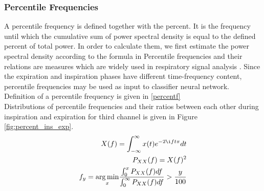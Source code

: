 \subsubsection{Percentile Frequencies}
A percentile frequency is defined together with the percent. It is the frequency until which the cumulative sum of power spectral density is equal to the defined percent of total power. In order to calculate them, we first estimate the power spectral density according to the formula in Percentile frequencies and their relations are measures which are widely used in respiratory signal analysis \cite{sergul, comparison-ar-based}. Since the expiration and inspiration phases have different time-frequency content, percentile frequencies may be used as input to classifier neural network. Definition of a percentile frequency is given in \eqref{percentf} \\ Distributions of percentile frequencies and their ratios between each other during inspiration and expiration for third channel is given in Figure \ref{fig:percent_ins_exp}.
\begin{align}
	X(f) = \int_{-\infty}^{\infty}x(t)e^{-2{\i}ft\pi}dt \label{ft} \\
	P_{XX}(f) = X(f)^2 \label{psd}\\
	f_{y} = \underset{x}\argmin \frac{\int_{0}^{x} P_{XX}(f) df}{\int_{0}^{\infty} P_{XX}(f) df}   > \frac{y}{100} \label{percentf}
\end{align}

